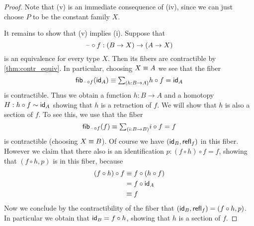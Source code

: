 \begin{proof}
Note that (v) is an immediate consequence of (iv), since we can just choose $P$ to be the constant family $X$.

It remains to show that (v) implies (i). Suppose that
\begin{equation*}
\blank\circ f:(B\to X)\to (A\to X)
\end{equation*}
is an equivalence for every type $X$. Then its fibers are contractible by \cref{thm:contr_equiv}. In particular, choosing $X\jdeq A$ we see that the fiber
\begin{equation*}
\fib{\blank\circ f}{\idfunc[A]}\jdeq \sm{h:B\to A}h\circ f=\idfunc[A]
\end{equation*}
is contractible. Thus we obtain a function $h:B\to A$ and a homotopy $H:h\circ f\htpy\idfunc[A]$ showing that $h$ is a retraction of $f$. We will show that $h$ is also a section of $f$. To see this, we use that the fiber
\begin{equation*}
\fib{\blank\circ f}{f}\jdeq \sm{i:B\to B} i\circ f=f
\end{equation*}
is contractible (choosing $X\jdeq B$). 
Of course we have $(\idfunc[B],\refl{f})$ in this fiber. However we claim that there also is an identification $p:(f\circ h)\circ f=f$, showing that $(f\circ h,p)$ is in this fiber, because
\begin{align*}
(f\circ h)\circ f & \jdeq f\circ (h\circ f) \\
& = f\circ \idfunc[A] \\
& \jdeq f
\end{align*}
Now we conclude by the contractibility of the fiber that $(\idfunc[B],\refl{f})=(f\circ h,p)$. In particular we obtain that $\idfunc[B]=f\circ h$, showing that $h$ is a section of $f$.
\end{proof}


